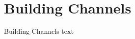 

\section{Building Channels}\fbeg{}\begin{frame}{}

{\fontsize{20}{23}\selectfont

Building Channels text

}

\end{frame}


